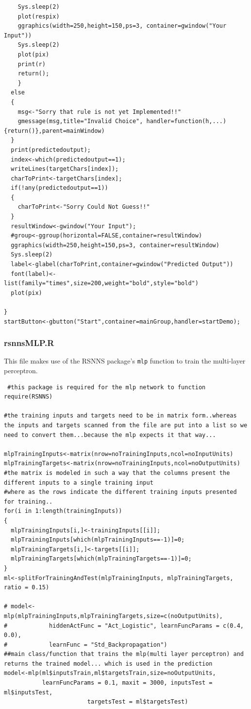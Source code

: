 \documentclass[a4paper,12pt]{report}
\begin{document}
\begin{verbatim}
    Sys.sleep(2)
    plot(respix)
    ggraphics(width=250,height=150,ps=3, container=gwindow("Your Input"))
    Sys.sleep(2)
    plot(pix)
    print(r)
    return();
    }
  else
  {
    msg<-"Sorry that rule is not yet Implemented!!"
    gmessage(msg,title="Invalid Choice", handler=function(h,...){return()},parent=mainWindow)
  }
  print(predictedoutput);
  index<-which(predictedoutput==1);
  writeLines(targetChars[index]);
  charToPrint<-targetChars[index];
  if(!any(predictedoutput==1))
  {
    charToPrint<-"Sorry Could Not Guess!!"
  }
  resultWindow<-gwindow("Your Input");
  #group<-ggroup(horizontal=FALSE,container=resultWindow)
  ggraphics(width=250,height=150,ps=3, container=resultWindow)
  Sys.sleep(2)
  label<-glabel(charToPrint,container=gwindow("Predicted Output"))
  font(label)<- list(family="times",size=200,weight="bold",style="bold")
  plot(pix)
  
}
startButton<-gbutton("Start",container=mainGroup,handler=startDemo);
\end{verbatim}

\subsubsection*{rsnnsMLP.R}
This file makes use of the RSNNS package's \verb+mlp+ function to train the multi-layer perceptron.

\begin{verbatim}
 #this package is required for the mlp network to function
require(RSNNS)

#the training inputs and targets need to be in matrix form..whereas the inputs and targets scanned from the file are put into a list so we need to convert them...because the mlp expects it that way...

mlpTrainingInputs<-matrix(nrow=noTrainingInputs,ncol=noInputUnits)
mlpTrainingTargets<-matrix(nrow=noTrainingInputs,ncol=noOutputUnits)
#the matrix is modeled in such a way that the columns present the different inputs to a single training input
#where as the rows indicate the different training inputs presented for training..
for(i in 1:length(trainingInputs))
{
  mlpTrainingInputs[i,]<-trainingInputs[[i]];
  mlpTrainingInputs[which(mlpTrainingInputs==-1)]=0;
  mlpTrainingTargets[i,]<-targets[[i]];
  mlpTrainingTargets[which(mlpTrainingTargets==-1)]=0;
}
ml<-splitForTrainingAndTest(mlpTrainingInputs, mlpTrainingTargets, ratio = 0.15)

# model<-mlp(mlpTrainingInputs,mlpTrainingTargets,size=c(noOutputUnits),
#            hiddenActFunc = "Act_Logistic", learnFuncParams = c(0.4, 0.0),
#            learnFunc = "Std_Backpropagation")
##main class/function that trains the mlp(multi layer perceptron) and returns the trained model... which is used in the prediction
model<-mlp(ml$inputsTrain,ml$targetsTrain,size=noOutputUnits,
           learnFuncParams = 0.1, maxit = 3000, inputsTest = ml$inputsTest,
						targetsTest = ml$targetsTest)


\end{verbatim}
\end{document}
